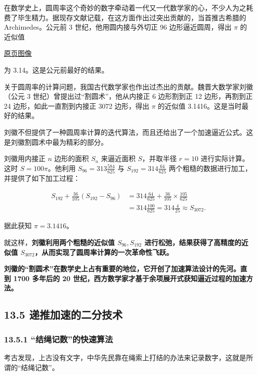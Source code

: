 \documentclass[
  10pt,
  fontset=fandol]{ctexart}
\begin{document}
在数学史上，圆周率这个奇妙的数字牵动着一代又一代数学家的心，不少人为之耗费了毕生精力。据现存文献记载，在这方面作出过突出贡献的，当首推古希腊的 Archimedes。公元前 3 世纪，他用圆内接与外切正 96 边形逼近圆周，得出 \(\pi\) 的近似值

\href{../../source-images/pdf-314.jpeg}{原页图像}

为 3.14。这是公元前最好的结果。

关于圆周率的计算问题，我国古代数学家也作出过杰出的贡献。魏晋大数学家刘徽（公元 3 世纪）曾提出过``割圆术''，他从内接正 6 边形割到正 12 边形，再割到正 24 边形，如此一直割到内接正 3072 边形，得出 \(\pi\) 的近似值 3.1416。这是当时最好的结果。

刘徽不但提供了一种圆周率计算的迭代算法，而且还给出了一个加速逼近公式。这是刘徽割圆术中最为精彩的部分。

刘徽用内接正 \(n\) 边形的面积 \(S_n\) 来逼近面积 \(S\)，并取半径 \(r=10\) 进行实际计算。这时 \(S=100\pi\)。他利用 \(S_{96}=313\frac{584}{625}\) 与 \(S_{192}=314\frac{64}{625}\) 两个粗糙的数据进行加工，并提供了如下加工过程：

\[
\begin{aligned}
S_{192}+\frac{36}{105}(S_{192}-S_{96})
&=314\frac{64}{625}+\frac{36}{105}\times\frac{105}{625}\\
&=314\frac{100}{625}=314\frac{4}{25}\approx S_{3072}.
\end{aligned}
\]

据此获知 \(\pi=3.1416\)。

就这样，\textbf{刘徽利用两个粗糙的近似值 \(S_{96},S_{192}\) 进行松弛，结果获得了高精度的近似值 \(S_{3072}\)，从而实现了圆周率计算的一次革命性飞跃。}

\textbf{刘徽的``割圆术''在数学史上占有重要的地位，它开创了加速算法设计的先河。直到 1700 多年后的 20 世纪，西方数学家才基于余项展开式获知逼近过程的加速方法。}

\subsection{13.5 递推加速的二分技术}\label{ux9012ux63a8ux52a0ux901fux7684ux4e8cux5206ux6280ux672f}

\subsubsection{13.5.1 ``结绳记数''的快速算法}\label{ux7ed3ux7ef3ux8bb0ux6570ux7684ux5febux901fux7b97ux6cd5}

考古发现，上古没有文字，中华先民靠在绳索上打结的办法来记录数字，这就是所谓的``结绳记数''。
\end{document}
